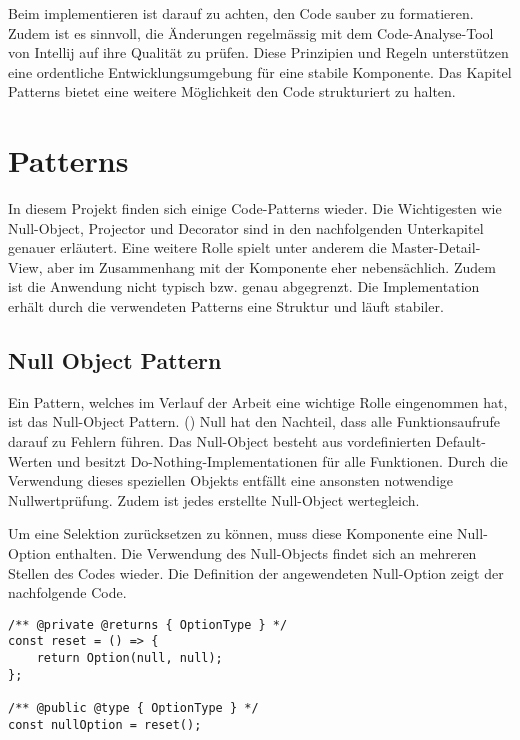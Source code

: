 Beim implementieren ist darauf zu achten, den Code sauber zu formatieren.
Zudem ist es sinnvoll, die Änderungen regelmässig mit dem Code-Analyse-Tool von Intellij auf ihre Qualität zu prüfen. 
Diese Prinzipien und Regeln unterstützen eine ordentliche Entwicklungsumgebung für eine stabile Komponente.
Das Kapitel Patterns bietet eine weitere Möglichkeit den Code strukturiert zu halten.


\section{Patterns}
\label{sec:patterns}

In diesem Projekt finden sich einige Code-Patterns wieder.
Die Wichtigesten wie Null-Object, Projector und Decorator sind in den nachfolgenden Unterkapitel genauer erläutert.
Eine weitere Rolle spielt unter anderem die Master-Detail-View, aber im Zusammenhang mit der Komponente eher nebensächlich.
Zudem ist die Anwendung nicht typisch bzw. genau abgegrenzt.
Die Implementation erhält durch die verwendeten Patterns eine Struktur und läuft stabiler.


\subsection{Null Object Pattern}
\label{sec:nullPattern}

Ein Pattern, welches im Verlauf der Arbeit eine wichtige Rolle eingenommen hat, ist das Null-Object Pattern.
(\cite{nullObjectPattern}) Null hat den Nachteil, dass alle Funktionsaufrufe darauf zu Fehlern führen.
Das Null-Object besteht aus vordefinierten Default-Werten und besitzt Do-Nothing-Implementationen für alle Funktionen.
Durch die Verwendung dieses speziellen Objekts entfällt eine ansonsten notwendige Nullwertprüfung.
Zudem ist jedes erstellte Null-Object wertegleich.

Um eine Selektion zurücksetzen zu können, muss diese Komponente eine Null-Option enthalten.
Die Verwendung des Null-Objects findet sich an mehreren Stellen des Codes wieder.
Die Definition der angewendeten Null-Option zeigt der nachfolgende Code.

\begin{lstlisting}[style = htmlcssjs, caption = Null-Option, label = code:nullOption]
/** @private @returns { OptionType } */
const reset = () => {
    return Option(null, null);
};

/** @public @type { OptionType } */
const nullOption = reset();
\end{lstlisting}

